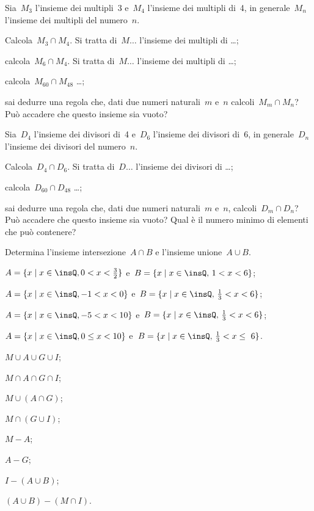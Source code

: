 \begin{esercizio}
\label{ese:5.100}
Sia~$M_{3}$ l'insieme dei multipli~3 e~$M_{4}$ l'insieme dei multipli di~4, in
generale~$M_{n}$ l'insieme dei multipli del numero~$n$.

 \begin{enumeratea}
 \item Calcola~$M_{3}\cap M_{4}$. Si tratta di~$M\ldots$ l'insieme dei multipli di \ldots;
 \item calcola~$M_{6}\cap M_{4}$. Si tratta di~$M\ldots$ l'insieme dei multipli di \ldots;
 \item calcola~$M_{60}\cap M_{48}$ \ldots;
 \item sai dedurre una regola che, dati due numeri naturali~$m$ e~$n$ calcoli~$M_{m}\cap M_{n}$? Può accadere che questo insieme sia vuoto?
 \end{enumeratea}
\end{esercizio}

\begin{esercizio}
\label{ese:5.101}
Sia~$D_{4}$ l'insieme dei divisori di~4 e~$D_{6}$ l'insieme dei divisori di~6, in
generale~$D_{n}$ l'insieme dei divisori del numero~$n$.

\begin{enumeratea}
 \item Calcola~$D_{4}\cap D_{6}$. Si tratta di~$D\ldots$ l'insieme dei divisori di \ldots;
 \item calcola~$D_{60}\cap D_{48}$ \ldots;
 \item sai dedurre una regola che, dati due numeri naturali~$m$ e~$n$,
calcoli~$D_{m}\cap D_{n}$? Può accadere che questo insieme sia
vuoto? Qual è il numero minimo di elementi che può contenere?
\end{enumeratea}
\end{esercizio}
\pagebreak

\begin{esercizio} %
\label{ese:5.102}
Determina l'insieme intersezione~$A\cap B$ e l'insieme unione~$A\cup B$.
\begin{enumeratea}
 \item $A=\{x\mid x\in\insQ,0<x<\frac{3}{2}\}$ e~$B=\{x\mid x\in\insQ\text{, }1<x<6\}$;
 \item $A=\{x\mid x\in\insQ,-1<x<0\}$ e~$B=\{x\mid x\in\insQ\text{, }\frac{1}{3}<x<6\}$;
 \item $A=\{x\mid x\in\insQ,-5<x<10\}$ e~$B=\{x\mid x\in\insQ\text{, }\frac{1}{3}<x<6\}$;
 \item $A=\{x\mid x\in\insQ,0\le x<10\}$ e~$B=\{x\mid x\in\insQ\text{, }\frac{1}{3}<x\le~6\}$.
 \item $M\cup A \cup G \cup I$;
 \item $M\cap A \cap G \cap I$;
 \item $M\cup (A\cap G)$;
 \item $M\cap (G\cup I)$;
 \item $M-A$;
 \item $A-G$;
 \item $I-(A\cup B)$;
 \item $(A\cup B)-(M\cap I)$.
\end{enumeratea}
\end{esercizio}

